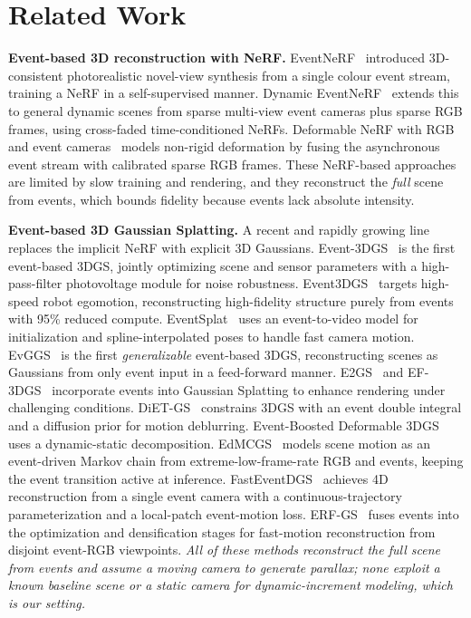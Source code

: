 \section{Related Work}
\label{sec:related}

\noindent\textbf{Event-based 3D reconstruction with NeRF.}
EventNeRF~\cite{eventnerf} introduced 3D-consistent photorealistic novel-view synthesis from a single colour event stream, training a NeRF in a self-supervised manner. Dynamic EventNeRF~\cite{dynamiceventnerf} extends this to general dynamic scenes from sparse multi-view event cameras plus sparse RGB frames, using cross-faded time-conditioned NeRFs. Deformable NeRF with RGB and event cameras~\cite{defnerfevent} models non-rigid deformation by fusing the asynchronous event stream with calibrated sparse RGB frames. These NeRF-based approaches are limited by slow training and rendering, and they reconstruct the \emph{full} scene from events, which bounds fidelity because events lack absolute intensity.

\noindent\textbf{Event-based 3D Gaussian Splatting.}
A recent and rapidly growing line replaces the implicit NeRF with explicit 3D Gaussians. Event-3DGS~\cite{event3dgs} is the first event-based 3DGS, jointly optimizing scene and sensor parameters with a high-pass-filter photovoltage module for noise robustness. Event3DGS~\cite{xiong2025event3dgs} targets high-speed robot egomotion, reconstructing high-fidelity structure purely from events with 95\% reduced compute. EventSplat~\cite{eventsplat} uses an event-to-video model for initialization and spline-interpolated poses to handle fast camera motion. EvGGS~\cite{evggs} is the first \emph{generalizable} event-based 3DGS, reconstructing scenes as Gaussians from only event input in a feed-forward manner. E2GS~\cite{e2gs} and EF-3DGS~\cite{ef3dgs} incorporate events into Gaussian Splatting to enhance rendering under challenging conditions. DiET-GS~\cite{dietgs} constrains 3DGS with an event double integral and a diffusion prior for motion deblurring. Event-Boosted Deformable 3DGS~\cite{eventboostdeform3dgs} uses a dynamic-static decomposition. EdMCGS~\cite{edmcgs} models scene motion as an event-driven Markov chain from extreme-low-frame-rate RGB and events, keeping the event transition active at inference. FastEventDGS~\cite{fasteventdgs} achieves 4D reconstruction from a single event camera with a continuous-trajectory parameterization and a local-patch event-motion loss. ERF-GS~\cite{erfgs} fuses events into the optimization and densification stages for fast-motion reconstruction from disjoint event-RGB viewpoints. \emph{All of these methods reconstruct the full scene from events and assume a moving camera to generate parallax; none exploit a known baseline scene or a static camera for dynamic-increment modeling, which is our setting.}

